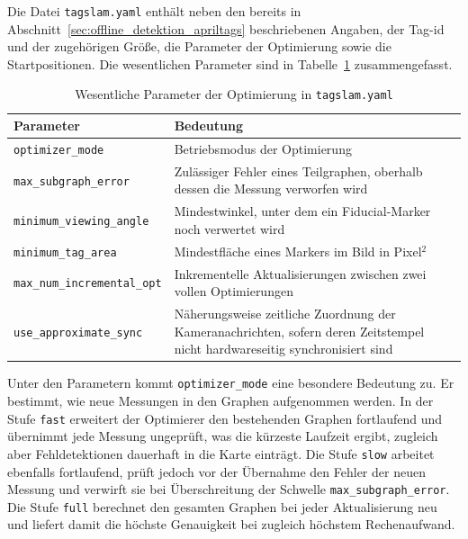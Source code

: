 Die Datei \texttt{tagslam.yaml} enthält neben den bereits in Abschnitt~\ref{sec:offline_detektion_apriltags} beschriebenen Angaben, der Tag-\gls{id} und 
der zugehörigen Größe, die Parameter der Optimierung sowie die Startpositionen.
Die wesentlichen Parameter sind in Tabelle~\ref{tab:tagslam_params} zusammengefasst.
\begin{table}[htbp]
\centering
\begin{tabularx}{\textwidth}{lX}
\toprule
\textbf{Parameter} & \textbf{Bedeutung} \\
\midrule
\texttt{optimizer\_mode}            & Betriebsmodus der Optimierung \\
\texttt{max\_subgraph\_error}       & Zulässiger Fehler eines Teilgraphen, oberhalb dessen die Messung verworfen wird \\
\texttt{minimum\_viewing\_angle}    & Mindestwinkel, unter dem ein Fiducial-Marker noch verwertet wird \\
\texttt{minimum\_tag\_area}         & Mindestfläche eines Markers im Bild in Pixel$^2$ \\
\texttt{max\_num\_incremental\_opt} & Inkrementelle Aktualisierungen zwischen zwei vollen Optimierungen \\
\texttt{use\_approximate\_sync}     & Näherungsweise zeitliche Zuordnung der Kameranachrichten, sofern deren Zeitstempel nicht hardwareseitig synchronisiert sind \\
\bottomrule
\end{tabularx}
\caption{Wesentliche Parameter der Optimierung in \texttt{tagslam.yaml}}
\label{tab:tagslam_params}
\end{table}
\FloatBarrier
Unter den Parametern kommt \texttt{optimizer\_mode} eine besondere Bedeutung zu.
Er bestimmt, wie neue Messungen in den Graphen aufgenommen werden.
In der Stufe \texttt{fast} erweitert der Optimierer den bestehenden Graphen fortlaufend und übernimmt jede Messung ungeprüft, was die kürzeste Laufzeit ergibt, zugleich aber Fehldetektionen dauerhaft in die Karte einträgt.
Die Stufe \texttt{slow} arbeitet ebenfalls fortlaufend, prüft jedoch vor der Übernahme den Fehler der neuen Messung und verwirft sie bei Überschreitung der Schwelle \texttt{max\_subgraph\_error}.
Die Stufe \texttt{full} berechnet den gesamten Graphen bei jeder Aktualisierung neu und liefert damit die höchste Genauigkeit bei zugleich höchstem Rechenaufwand.

